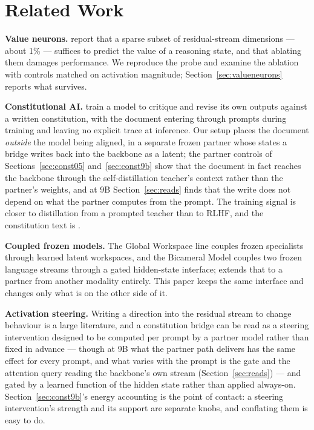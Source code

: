 \documentclass[11pt]{article}
\newcommand{\companion}{\citet{furui2026psilm}}
\begin{document}
\section{Related Work}
\label{sec:related2}

\textbf{Value neurons.} \citet{xu2026valueneurons} report that a sparse subset of residual-stream dimensions --- about 1\% --- suffices to predict the value of a reasoning state, and that ablating them damages performance. We reproduce the probe and examine the ablation with controls matched on activation magnitude; Section~\ref{sec:valueneurons} reports what survives.

\textbf{Constitutional AI.} \citet{bai2022cai} train a model to critique and revise its own outputs against a written constitution, with the document entering through prompts during training and leaving no explicit trace at inference. Our setup places the document \emph{outside} the model being aligned, in a separate frozen partner whose states a bridge writes back into the backbone as a latent; the partner controls of Sections~\ref{sec:const05} and~\ref{sec:const9b} show that the document in fact reaches the backbone through the self-distillation teacher's context rather than the partner's weights, and at 9B Section~\ref{sec:reads} finds that the write does not depend on what the partner computes from the prompt. The training signal is closer to distillation from a prompted teacher \citep{bai2022hh} than to RLHF, and the constitution text is \citet{anthropic2026constitution}.

\textbf{Coupled frozen models.} The Global Workspace line couples frozen specialists through learned latent workspaces, and the Bicameral Model \citep{flamant2026bicameral} couples two frozen language streams through a gated hidden-state interface; \companion{} extends that to a partner from another modality entirely. This paper keeps the same interface and changes only what is on the other side of it.

\textbf{Activation steering.} Writing a direction into the residual stream to change behaviour is a large literature, and a constitution bridge can be read as a steering intervention designed to be computed per prompt by a partner model rather than fixed in advance --- though at 9B what the partner path delivers has the same effect for every prompt, and what varies with the prompt is the gate and the attention query reading the backbone's own stream (Section~\ref{sec:reads}) --- and gated by a learned function of the hidden state rather than applied always-on. Section~\ref{sec:const9b}'s energy accounting is the point of contact: a steering intervention's strength and its support are separate knobs, and conflating them is easy to do.
\end{document}
